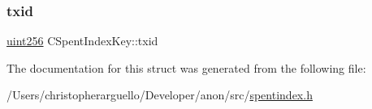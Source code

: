 \mbox{\label{struct_c_spent_index_key_a98f9dd57f9af971b4787ad7ede026f43}} 
\subsubsection{\texorpdfstring{txid}{txid}}
{\footnotesize\ttfamily \mbox{\hyperlink{classuint256}{uint256}} C\+Spent\+Index\+Key\+::txid}



The documentation for this struct was generated from the following file\+:\begin{DoxyCompactItemize}
\item 
/\+Users/christopherarguello/\+Developer/anon/src/\mbox{\hyperlink{spentindex_8h}{spentindex.\+h}}\end{DoxyCompactItemize}

